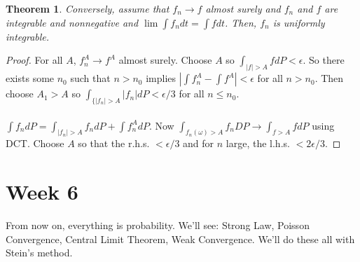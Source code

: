 \documentclass[12pt]{article}
\newtheorem{theorem}{Theorem}
\begin{document}
\begin{theorem}
Conversely, assume that $f_n \to f$ almost surely and $f_n$ and $f$ are integrable and nonnegative and $\lim \int f_n dt = \int f dt$.  Then, $f_n$ is uniformly integrable.
\end{theorem}
\begin{proof}
For all $A$, $f_n^A \to f^A$ almost surely.  Choose $A$ so $\int_{|f| > A} f dP  < \epsilon$.  So there exists some $n_0$ such that $n > n_0$ implies $|\int f_n^A - \int f^A | < \epsilon$ for all $n > n_0$.  Then choose $A_1 > A$ so $\int_{\{|f_n| > A} |f_n| dP < \epsilon / 3$ for all $n \le n_0$.
\\ \\
$\int f_n dP = \int_{|f_n| > A} f_n dP + \int f_n^A dP$.  Now $\int_{f_n(\omega) > A} f_n DP \rightarrow \int_{f > A} f dP$ using DCT.  Choose $A$ so that the r.h.s. $< \epsilon/3$ and for $n$ large, the l.h.s. $< 2 \epsilon / 3$.
\end{proof}


\section{Week 6}
From now on, everything is probability.  We'll see: Strong Law, Poisson Convergence, Central Limit Theorem, Weak Convergence.  We'll do these all with Stein's method.
\end{document}
